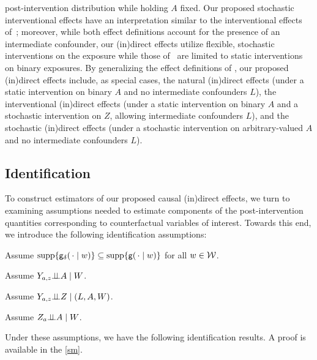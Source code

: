 post-intervention distribution while holding $A$ fixed. Our proposed stochastic
interventional effects have an interpretation similar to the interventional
effects of~\citet{vanderweele2014effect}; moreover, while both effect
definitions account for the presence of an intermediate confounder, our
(in)direct effects utilize flexible, stochastic interventions on the
exposure while those of~\citet{vanderweele2014effect} are limited to static
interventions on binary exposures. By generalizing the effect definitions of
\citet{diaz2020causal}, our proposed (in)direct effects include, as special
cases, the natural (in)direct effects (under a static intervention on binary $A$
and no intermediate confounders $L$), the interventional (in)direct effects
(under a static intervention on binary $A$ and a stochastic intervention on $Z$,
allowing intermediate confounders $L$), and the stochastic (in)direct effects
(under a stochastic intervention on arbitrary-valued $A$ and no intermediate
confounders $L$).

\subsection{Identification}\label{sec:iden}

To construct estimators of our proposed causal (in)direct effects, we turn to
examining assumptions needed to estimate components of the post-intervention
quantities corresponding to counterfactual variables of interest. Towards this
end, we introduce the following identification assumptions:
\begin{assumptioniden}\label{ass:cs}
  Assume $\mathop{\mathrm{supp}}\{\mathsf{g}_\delta(\, \cdot \mid w)\} \subseteq
  \mathop{\mathrm{supp}}\{\mathsf{g}(\, \cdot \mid w)\}$ for all $w\in \cal W$.
\end{assumptioniden}
\begin{assumptioniden}
  \label{ass:ncay}
  Assume $Y_{a,z} \mbox{$\perp\!\!\!\perp$} A \mid W$.
\end{assumptioniden}
\begin{assumptioniden}
  \label{ass:nczy}
  Assume $Y_{a,z} \mbox{$\perp\!\!\!\perp$} Z \mid (L,A,W)$.
\end{assumptioniden}
\begin{assumptioniden}
  \label{ass:ncaz}
  Assume $Z_a \mbox{$\perp\!\!\!\perp$} A \mid W$.
\end{assumptioniden}

Under these assumptions, we have the following identification results. A proof
is available in the \ref{sm}.

